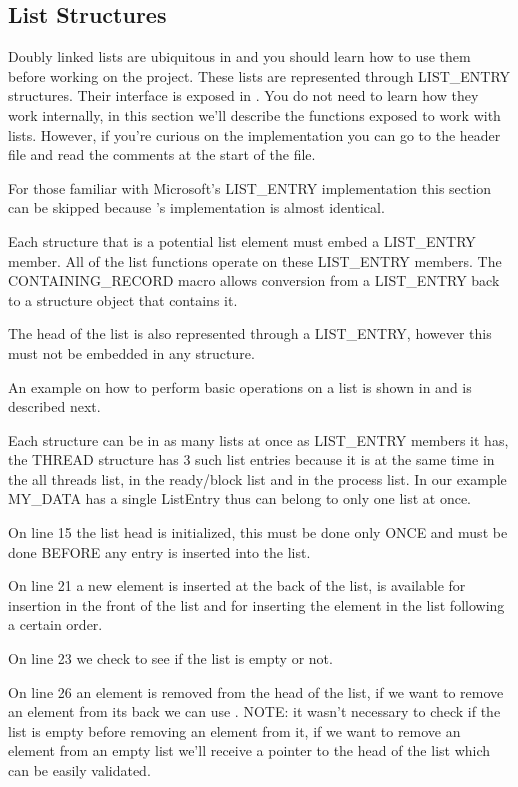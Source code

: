 \begin{appendices}
\section{List Structures}
\label{sect:Lists}

Doubly linked lists are ubiquitous in \projectname and you should learn how to use them before
working on the project. These lists are represented through LIST\_ENTRY structures. Their interface
is exposed in . You do not need to learn how they work internally, in this section
we'll describe the functions exposed to work with lists. However, if you're curious on the
implementation  you can go to the header file and read the comments at the start of the file.

For those familiar with Microsoft's LIST\_ENTRY implementation this section can be skipped because
\projectname's implementation is almost identical.

Each structure that is a potential list element must embed a LIST\_ENTRY member. All of the list
functions operate on these LIST\_ENTRY members. The CONTAINING\_RECORD macro allows conversion from
a LIST\_ENTRY back to a structure object that contains it.

The head of the list is also represented through a LIST\_ENTRY, however this must not be embedded in
any structure.

An example on how to perform basic operations on a list is shown in  and is
described next.

Each structure can be in as many lists at once as LIST\_ENTRY members it has, the THREAD structure
has 3 such list entries because it is at the same time in the all threads list, in the ready/block
list and in the process list. In our example MY\_DATA has a single ListEntry thus can belong to
only one list at once.

On line 15 the list head is initialized, this must be done only ONCE and must be done BEFORE any
entry is inserted into the list.

On line 21 a new element is inserted at the back of the list,  is available for
insertion in the front of the list and  for inserting the element in the
list following a certain order.

On line 23 we check to see if the list is empty or not.

On line 26 an element is removed from the head of the list, if we want to remove an element from its
back we can use . NOTE: it wasn't necessary to check if the list is empty
before removing an element from it, if we want to remove an element from an empty list we'll
receive a pointer to the head of the list which can be easily validated.


\end{appendices}
